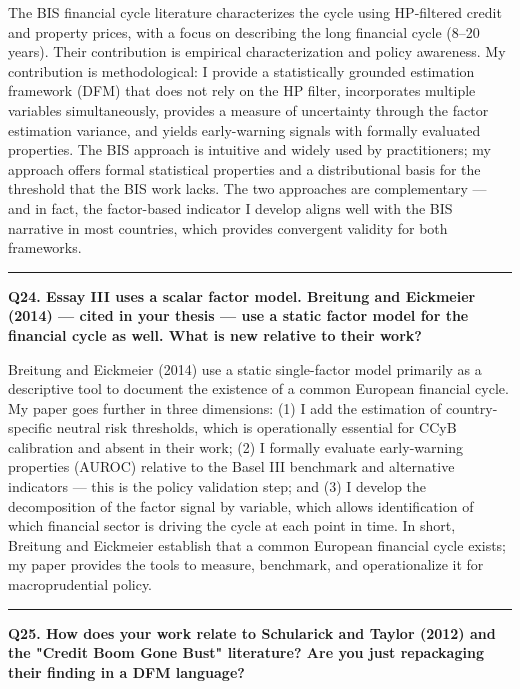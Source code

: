 \documentclass[11pt,a4paper]{article}
\begin{document}
The BIS financial cycle literature characterizes the cycle using HP-filtered credit and property prices, with a focus on describing the long financial cycle (8–20 years). Their contribution is empirical characterization and policy awareness. My contribution is methodological: I provide a statistically grounded estimation framework (DFM) that does not rely on the HP filter, incorporates multiple variables simultaneously, provides a measure of uncertainty through the factor estimation variance, and yields early-warning signals with formally evaluated properties. The BIS approach is intuitive and widely used by practitioners; my approach offers formal statistical properties and a distributional basis for the threshold that the BIS work lacks. The two approaches are complementary — and in fact, the factor-based indicator I develop aligns well with the BIS narrative in most countries, which provides convergent validity for both frameworks.

\medskip\hrule\medskip

\textbf{Q24. Essay III uses a scalar factor model. Breitung and Eickmeier (2014) — cited in your thesis — use a static factor model for the financial cycle as well. What is new relative to their work?}

Breitung and Eickmeier (2014) use a static single-factor model primarily as a descriptive tool to document the existence of a common European financial cycle. My paper goes further in three dimensions: (1) I add the estimation of country-specific neutral risk thresholds, which is operationally essential for CCyB calibration and absent in their work; (2) I formally evaluate early-warning properties (AUROC) relative to the Basel III benchmark and alternative indicators — this is the policy validation step; and (3) I develop the decomposition of the factor signal by variable, which allows identification of which financial sector is driving the cycle at each point in time. In short, Breitung and Eickmeier establish that a common European financial cycle exists; my paper provides the tools to measure, benchmark, and operationalize it for macroprudential policy.

\medskip\hrule\medskip

\textbf{Q25. How does your work relate to Schularick and Taylor (2012) and the "Credit Boom Gone Bust" literature? Are you just repackaging their finding in a DFM language?}
\end{document}
